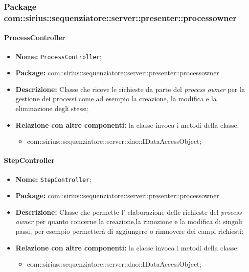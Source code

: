 \subsubsection{Package com::sirius::sequenziatore::server::presenter::processowner}
\paragraph{ProcessController}
	\begin{itemize}
		\item \textbf{Nome:} \texttt{ProcessController};
		\item \textbf{Package:} com::sirius::sequenziatore::server::presenter::processowner
		\item \textbf{Descrizione:} Classe che riceve le richieste da parte del \textit{process owner} per la gestione dei processi come ad esempio la creazione, la modifica e la eliminazione degli stessi;
		\item \textbf{Relazione con altre componenti:} la classe invoca i metodi della classe:
		\begin{itemize}
			\item com::sirius::sequenziatore::server::dao::IDataAccessObject;
		\end{itemize}
	\end{itemize}
\paragraph{StepController}
	\begin{itemize}
		\item \textbf{Nome:} \texttt{StepController};
		\item \textbf{Package:} com::sirius::sequenziatore::server::presenter::processowner
		\item \textbf{Descrizione:} Classe che permette l' elaborazione delle richieste del \textit{process owner} per quanto concerne la creazione,la rimozione e la modifica di singoli passi, per esempio permetterà di aggiungere o rimuovere dei campi richiesti;
		\item \textbf{Relazione con altre componenti:} la classe invoca i metodi della classe:
		\begin{itemize}
			\item com::sirius::sequenziatore::server::dao::IDataAccessObject;
		\end{itemize}
	\end{itemize}
